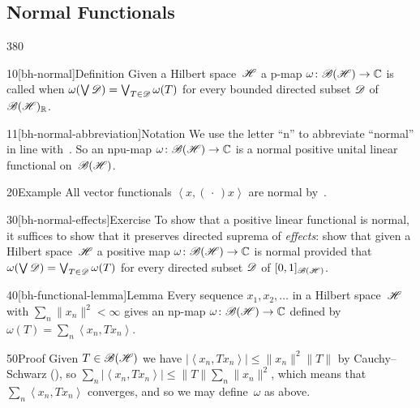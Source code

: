 \subsection{Normal Functionals}
\begin{parsec}{380}%
\begin{point}{10}[bh-normal]{Definition}%
Given a Hilbert space~$\mathscr{H}$
a p-map $\omega\colon \mathscr{B}(\mathscr{H})\to\mathbb{C}$
is called %
when
$\omega(\bigvee \mathscr{D})=\bigvee_{T\in\mathscr{D}} \omega(T)$
for every bounded directed subset $\mathscr{D}$ of~$\mathscr{B}(\mathscr{H})_{\mathbb{R}}$.
\begin{point}{11}[bh-normal-abbreviation]{Notation}%
We use the letter ``n'' to abbreviate ``normal'' in line with~.
So an npu-map $\omega\colon \mathscr{B}(\mathscr{H})\to\mathbb{C}$
is a normal positive unital linear functional
on~$\mathscr{B}(\mathscr{H})$.
\end{point}
\end{point}
\begin{point}{20}{Example}%
All vector functionals%
$\left<x,(\,\cdot\,)x\right>$ are normal by~.
\end{point}
\begin{point}{30}[bh-normal-effects]{Exercise}%
To show that a positive linear functional is normal, it suffices to show 
that it preserves directed suprema of \emph{effects}: 
show that given a Hilbert space~$\mathscr{H}$
a  positive map $\omega\colon \mathscr{B}(\mathscr{H})\to\mathbb{C}$
is normal 
provided that $\omega(\bigvee \mathscr{D}) = \bigvee_{T\in\mathscr{D}} \omega(T)$
for every directed subset $\mathscr{D}$ of $[0,1]_{\mathscr{B}(\mathscr{H})}$.
\end{point}
\begin{point}{40}[bh-functional-lemma]{Lemma}%
Every sequence $x_1,x_2,\dotsc $ in a Hilbert space~$\mathscr{H}$
with $\sum_n \|x_n\|^2 < \infty$
gives an np-map $\omega\colon\mathscr{B}(\mathscr{H})\to\mathbb{C}$
defined by~$\omega(T)=\sum_n \left<x_n,Tx_n\right>$.
\begin{point}{50}{Proof}%
Given $T\in\mathscr{B}(\mathscr{H})$ 
we have $\left|\left<x_n,Tx_n\right>\right|\leq \|x_n\|^2\|T\|$ 
by Cauchy--Schwarz (),
so $\sum_n \left|\left<x_n,Tx_n\right>\right|
\leq \|T\| \sum_n \|x_n\|^2$,
which means that~$\sum_n \left<x_n,Tx_n\right>$
converges, 
and so we may define~$\omega$ as above.


\end{point}
\end{point}
\end{parsec}
